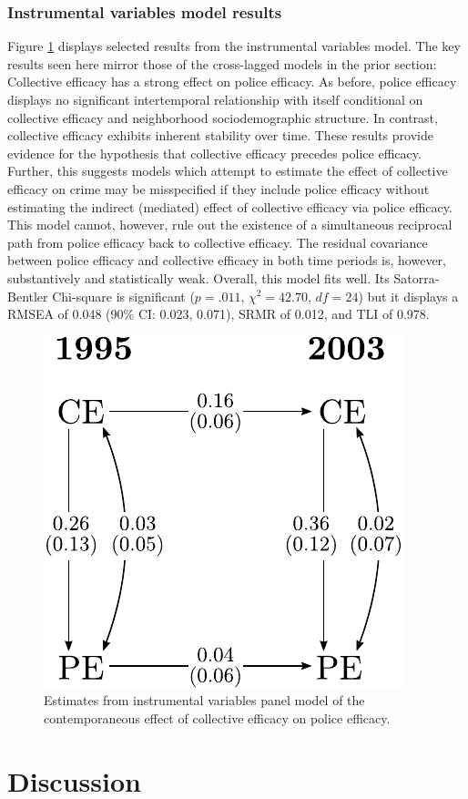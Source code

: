 \documentclass [11pt, proquest] {uwthesis}[2015/03/03]
\begin{document}
\hypertarget{instrumental-variables-model-results}{%
\subsubsection{Instrumental variables model results}\label{instrumental-variables-model-results}}

Figure \ref{fig:ivresults} displays selected results from the instrumental variables model. The key results seen here mirror those of the cross-lagged models in the prior section: Collective efficacy has a strong effect on police efficacy. As before, police efficacy displays no significant intertemporal relationship with itself conditional on collective efficacy and neighborhood sociodemographic structure. In contrast, collective efficacy exhibits inherent stability over time. These results provide evidence for the hypothesis that collective efficacy precedes police efficacy. Further, this suggests models which attempt to estimate the effect of collective efficacy on crime may be misspecified if they include police efficacy without estimating the indirect (mediated) effect of collective efficacy via police efficacy. This model cannot, however, rule out the existence of a simultaneous reciprocal path from police efficacy back to collective efficacy. The residual covariance between police efficacy and collective efficacy in both time periods is, however, substantively and statistically weak. Overall, this model fits well. Its Satorra-Bentler Chi-square is significant (\(p =.011\), \(\chi^{2}=42.70\), \(df = 24\)) but it displays a RMSEA of 0.048 (90\% CI: 0.023, 0.071), SRMR of 0.012, and TLI of 0.978.
\begin{figure}

{\centering \includegraphics[width=0.6\linewidth]{./figure/ch3/iv_model_results} 

}

\caption{Estimates from instrumental variables panel model of the contemporaneous effect of collective efficacy on police efficacy.}\label{fig:ivresults}
\end{figure}
\hypertarget{discussion-1}{%
\section{Discussion}\label{discussion-1}}
\end{document}
